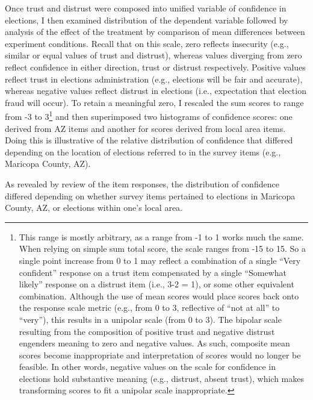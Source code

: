 \documentclass[
  12pt,
  letterpaper,
]{article}
\begin{document}
Once trust and distrust were composed into unified variable of
confidence in elections, I then examined distribution of the dependent
variable followed by analysis of the effect of the treatment by
comparison of mean differences between experiment conditions. Recall
that on this scale, zero reflects insecurity (e.g., similar or equal
values of trust and distrust), whereas values diverging from zero
reflect confidence in either direction, trust or distrust respectively.
Positive values reflect trust in elections administration (e.g.,
elections will be fair and accurate), whereas negative values reflect
distrust in elections (i.e., expectation that election fraud will
occur). To retain a meaningful zero, I rescaled the sum scores to range
from -3 to 3\footnote{This range is mostly arbitrary, as a range from -1
  to 1 works much the same. When relying on simple sum total score, the
  scale ranges from -15 to 15. So a single point increase from 0 to 1
  may reflect a combination of a single ``Very confident'' response on a
  trust item compensated by a single ``Somewhat likely'' response on a
  distrust item (i.e., 3-2 = 1), or some other equivalent combination.
  Although the use of mean scores would place scores back onto the
  response scale metric (e.g., from 0 to 3, reflective of ``not at all''
  to ``very''), this results in a unipolar scale (from 0 to 3). The
  bipolar scale resulting from the composition of positive trust and
  negative distrust engenders meaning to zero and negative values. As
  such, composite mean scores become inappropriate and interpretation of
  scores would no longer be feasible. In other words, negative values on
  the scale for confidence in elections hold substantive meaning (e.g.,
  distrust, absent trust), which makes transforming scores to fit a
  unipolar scale inappropriate.} and then superimposed two histograms of
confidence scores: one derived from AZ items and another for scores
derived from local area items. Doing this is illustrative of the
relative distribution of confidence that differed depending on the
location of elections referred to in the survey items (e.g., Maricopa
County, AZ).

As revealed by review of the item responses, the distribution of
confidence differed depending on whether survey items pertained to
elections in Maricopa County, AZ, or elections within one's local area.
\end{document}
